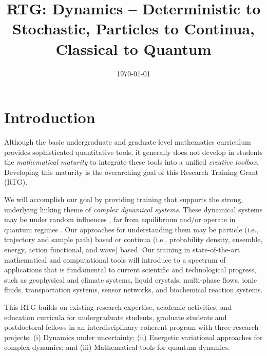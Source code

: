 \documentclass[11pt]{article}
\begin{document}
  
\title{RTG: Dynamics -- Deterministic to Stochastic, Particles to Continua, Classical to Quantum }
\author{    }

\date{\today}
 
\maketitle


\section{Introduction}

Although the basic undergraduate and graduate level mathematics curriculum provides sophisticated quantitative tools, it generally does not develop in students the \emph{mathematical maturity} to integrate these tools into a unified \emph{creative toolbox}. Developing this maturity is the overarching goal of this Research Training Grant (RTG).  

We will accomplish our goal by providing training that supports the strong, underlying linking theme of \emph{complex dynamical systems}.  These dynamical systems may be under random influences \cite{Arnold, Duan2015}, far from equilibrium \cite{liu2009introduction} and/or operate in quantum regimes \cite{Mbius1996DittrichWR}. Our approaches for understanding them may be particle (i.e., trajectory and sample path) based or continua (i.e., probability density, ensemble, energy, action functional, and wave) based.  Our training in state-of-the-art mathematical and computational tools will introduce to a spectrum of applications that is fundamental to current scientific and technological progress, such as geophysical and climate systems, liquid crystals, multi-phase flows, ionic fluids,  transportation systems, sensor networks, and biochemical reaction systems. 


This RTG builds on existing research expertise, academic activities,   and education curricula for undergraduate students,  graduate students and postdoctoral fellows in an interdisciplinary coherent  program with three research projects: (i) Dynamics under uncertainty;
(ii) Energetic variational approaches for complex dynamics; and (iii) 
Mathematical tools for quantum dynamics. 
\end{document}
